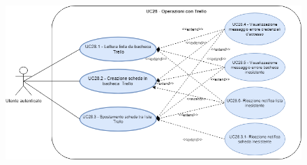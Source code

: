 \begin{figure}[H]
	\centering
	\includegraphics[width=14cm,keepaspectratio]{../includes/pics/trello.png}
	\caption{\label{fig:mission} }
\end{figure}

